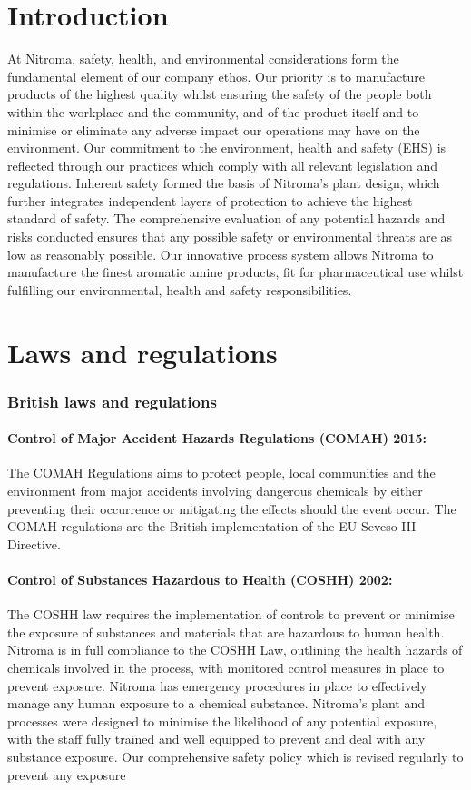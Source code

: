 \section{Introduction}

At Nitroma, safety, health, and environmental considerations form the fundamental element of our company ethos. Our priority is to manufacture products of the highest quality whilst ensuring the safety of the people both within the workplace and the community, and of the product itself and to minimise or eliminate any adverse impact our operations may have on the environment. Our commitment to the environment, health and safety (EHS) is reflected through our practices which comply with all relevant legislation and regulations. Inherent safety formed the basis of Nitroma’s plant design, which further integrates independent layers of protection to achieve the highest standard of safety. The comprehensive evaluation of any potential hazards and risks conducted ensures that any possible safety or environmental threats are as low as reasonably possible. Our innovative process system allows Nitroma to manufacture the finest aromatic amine products, fit for pharmaceutical use whilst fulfilling our environmental, health and safety responsibilities.

\section{Laws and regulations}

\subsubsection{British laws and regulations}

\paragraph{Control of Major Accident Hazards Regulations (COMAH) 2015:} 
The COMAH Regulations aims to protect people, local communities and the environment from major accidents involving dangerous chemicals by either preventing their occurrence or mitigating the effects should the event occur. The COMAH regulations are the British implementation of the EU Seveso III Directive. 

\paragraph{Control of Substances Hazardous to Health (COSHH) 2002:}
The COSHH law requires the implementation of controls to prevent or minimise the exposure of substances and materials that are hazardous to human health.
Nitroma is in full compliance to the COSHH Law, outlining the health hazards of chemicals involved in the process, with monitored control measures in place to prevent exposure. Nitroma has emergency procedures in place to effectively manage any human exposure to a chemical substance. Nitroma’s plant and processes were designed to minimise the likelihood of any potential exposure, with the staff fully trained and well equipped to prevent and deal with any substance exposure. Our comprehensive safety policy which is revised regularly to prevent any exposure

